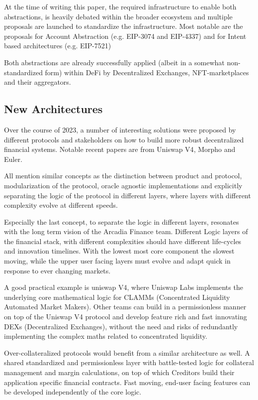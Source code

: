 \documentclass[sigconf,nonacm]{acmart}
\begin{document}
At the time of writing this paper, the required infrastructure to enable both abstractions, is heavily debated within the broader ecosystem and multiple proposals are launched to standardize the infrastructure.
Most notable are the proposals for Account Abstraction (e.g. EIP-3074 and EIP-4337) and for Intent based architectures (e.g. EIP-7521)

Both abstractions are already successfully applied (albeit in a somewhat non-standardized form) within DeFi by Decentralized Exchanges, NFT-marketplaces and their aggregators.

\subsection{New Architectures}
\label{subsec:new-architectures}
Over the course of 2023, a number of interesting solutions were proposed by different protocols and stakeholders on how to build more robust decentralized financial systems.
Notable recent papers are from Uniswap V4\cite{adams2023uniswap}, Morpho\cite{gontier2023morpho} and Euler\cite{euler2023protocols}.

All mention similar concepts as the distinction between product and protocol, modularization of the protocol,
oracle agnostic implementations and explicitly separating the logic of the protocol in different layers,
where layers with different complexity evolve at different speeds.

Especially the last concept, to separate the logic in different layers, resonates with the long term vision of the Arcadia Finance team.
Different Logic layers of the financial stack, with different complexities should have different life-cycles and innovation timelines.
With the lowest most core component the slowest moving, while the upper user facing layers must evolve and adapt quick in response to ever changing markets.

A good practical example is uniswap V4,
where Uniswap Labs implements the underlying core mathematical logic for CLAMMs (Concentrated Liquidity Automated Market Makers).
Other teams can build in a permissionless manner on top of the Uniswap V4 protocol and develop feature rich and fast innovating DEXs (Decentralized Exchanges),
without the need and risks of redundantly implementing the complex maths related to concentrated liquidity.

Over-collateralized protocols would benefit from a similar architecture as well.
A shared standardized and permissionless layer with battle-tested logic for collateral management and margin calculations,
on top of which Creditors build their application specific financial contracts.
Fast moving, end-user facing features can be developed independently of the core logic.
\end{document}
